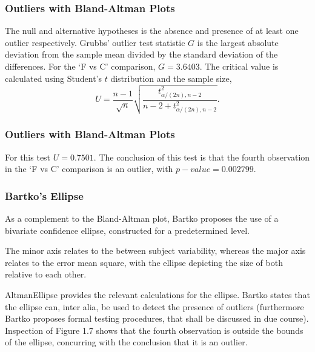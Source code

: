 \documentclass[compress]{beamer}        %
\begin{document}
\begin{frame}
\frametitle{Outliers with Bland-Altman Plots}
The null and alternative hypotheses is the absence and presence of
at least one outlier respectively. Grubbs' outlier test statistic
$G$ is the largest absolute deviation from the sample mean divided
by the standard deviation of the differences. For the `F vs C'
comparison, $G = 3.6403$. The critical value is calculated using
Student's $t$ distribution and the sample size,
\begin{equation}
U = \frac{n-1}{\sqrt{n}} \sqrt{\frac{t_{\alpha/(2n),n-2}^2}{n - 2
+ t_{\alpha/(2n),n-2}^2}}.
\end{equation}
\end{frame}

\begin{frame}
\frametitle{Outliers with Bland-Altman Plots}
For this test $U = 0.7501$. The conclusion of this test is that
the fourth observation in the `F vs C' comparison is an outlier,
with $p-value = 0.002799$.
\end{frame}
\frametitle{Bartko's Ellipse}
\begin{frame}
As a complement to the Bland-Altman plot, \alert{Bartko} proposes
the use of a bivariate confidence ellipse, constructed for a
predetermined level.

The minor axis relates to the between subject variability, whereas
the major axis relates to the error mean square, with the ellipse
depicting the size of both relative to each
other.
\end{frame}
\begin{frame}

\alert{AltmanEllipse} provides the relevant calculations for
the ellipse. Bartko states that the ellipse can, inter alia, be
used to detect the presence of outliers (furthermore
\alert{Bartko} proposes formal testing procedures, that shall be
discussed in due course). Inspection of Figure 1.7 shows that the
fourth observation is outside the bounds of the ellipse,
concurring with the conclusion that it is an outlier.
\end{frame}
\end{document}

